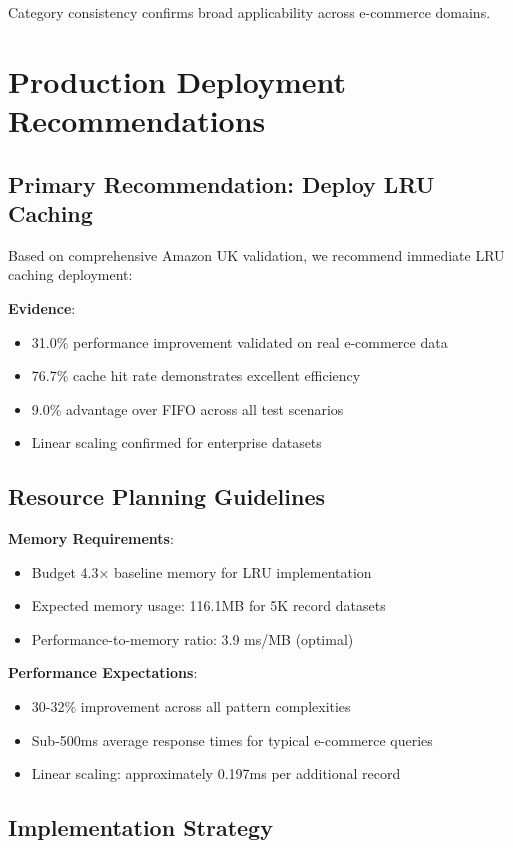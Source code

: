 \documentclass[conference]{IEEEtran}
\begin{document}
Category consistency confirms broad applicability across e-commerce domains.

\section{Production Deployment Recommendations}

\subsection{Primary Recommendation: Deploy LRU Caching}

Based on comprehensive Amazon UK validation, we recommend immediate LRU caching deployment:

\textbf{Evidence}:
\begin{itemize}
\item 31.0\% performance improvement validated on real e-commerce data
\item 76.7\% cache hit rate demonstrates excellent efficiency
\item 9.0\% advantage over FIFO across all test scenarios
\item Linear scaling confirmed for enterprise datasets
\end{itemize}

\subsection{Resource Planning Guidelines}

\textbf{Memory Requirements}:
\begin{itemize}
\item Budget 4.3× baseline memory for LRU implementation
\item Expected memory usage: 116.1MB for 5K record datasets
\item Performance-to-memory ratio: 3.9 ms/MB (optimal)
\end{itemize}

\textbf{Performance Expectations}:
\begin{itemize}
\item 30-32\% improvement across all pattern complexities
\item Sub-500ms average response times for typical e-commerce queries
\item Linear scaling: approximately 0.197ms per additional record
\end{itemize}

\subsection{Implementation Strategy}
\end{document}
